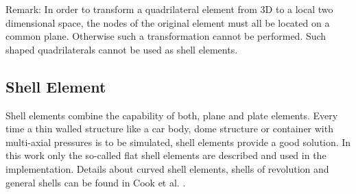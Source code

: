   Remark: In order to transform a quadrilateral element from 3D to a local two dimensional space, the nodes of the original element must all be located on a common plane. Otherwise such a transformation cannot be performed. Such shaped quadrilaterals cannot be used as shell elements.
 
 
 \subsection{Shell Element}\label{sec:Shell-Shell}
 Shell elements combine the capability of both, plane and plate elements. Every time a thin walled structure like a car body, dome structure or container with multi-axial pressures is to be simulated, shell elements provide a good solution. In this work only the so-called flat shell elements are described and used in the implementation. Details about curved shell elements, shells of revolution and general shells can be found in Cook et al. \cite{cook2002concepts}.
 
